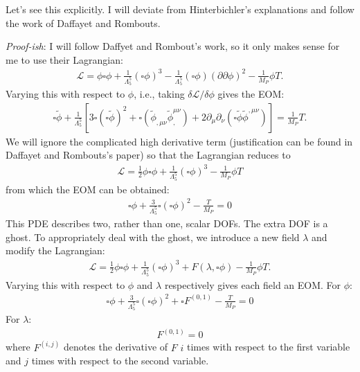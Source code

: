 \documentclass{book}
\theoremstyle{definition}
\newcommand{\p}{\partial}
\newcommand{\lag}{\mathcal{L}}
\newcommand{\f}[2]{\frac{#1}{#2}}
\newcommand{\lp}{\left(}
\newcommand{\rp}{\right)}
\newcommand{\lb}{\left[}
\newcommand{\rb}{\right]}
\begin{document}
Let's see this explicitly. I will deviate from Hinterbichler's explanations and follow the work of Daffayet and Rombouts. 
\begin{framed}
	\textit{Proof-ish}: I will follow Daffyet and Rombout's work, so it only makes sense for me to use their Lagrangian:
	\begin{align}
	\lag = \phi \square \phi + \f{1}{\Lambda_5^5}(\square \phi)^3 - \f{1}{\Lambda_5^5}(\square \phi)(\p \p \phi)^2 - \f{1}{M_P}\phi T.
	\end{align}
	Varying this with respect to $\phi$, i.e., taking $\delta \lag / \delta \phi$ gives the EOM:
	\begin{align}
	\square \tilde\phi + \f{1}{\Lambda_5^5} \lb 3\square(\square \tilde\phi)^2 + \square \lp \tilde\phi_{,\mu\nu} \tilde\phi_,^{\mu\nu}\rp + 2\p_\mu \p_\nu (\square \tilde\phi \tilde\phi^{,\mu\nu}) \rb = \f{1}{M_P}T.
	\end{align}
	We will ignore the complicated high derivative term (justification can be found in Daffayet and Rombouts's paper) so that the Lagrangian reduces to
	\begin{align}
	\boxed{\lag = \f{1}{2}\phi \square \phi + \f{1}{\Lambda_5^5}(\square \phi)^3 - \f{1}{M_P}\phi T}
	\end{align}
	from which the EOM can be obtained:
	\begin{align}
	\boxed{\square \phi + \f{3}{\Lambda_5^5}\square (\square \phi)^2 - \f{T}{M_P} = 0}
	\end{align}
	This PDE describes two, rather than one, scalar DOFs. The extra DOF is a ghost. To appropriately deal with the ghost, we introduce a new field $\lambda$ and modify the Lagrangian:
	\begin{align}
	\lag = \f{1}{2}\phi \square \phi + \f{1}{\Lambda_5^5}(\square \phi)^3 + F(\lambda,\square \phi) - \f{1}{M_P}\phi T.
	\end{align}
	Varying this with respect to $\phi$ and $\lambda$ respectively gives each field an EOM. For $\phi$:
	\begin{align}
	\boxed{\square \phi + \f{3}{\Lambda_5^5} \square (\square \phi)^2 + \square F^{(0,1)}  -\f{T}{M_P} = 0  }
	\end{align}
	For $\lambda$:
	\begin{align}
	\boxed{F^{(0,1)} = 0}
	\end{align}
	where $F^{(i,j)}$ denotes the derivative of $F$ $i$ times with respect to the first variable and $j$ times with respect to the second variable. \\
	

\end{framed}
\end{document}
